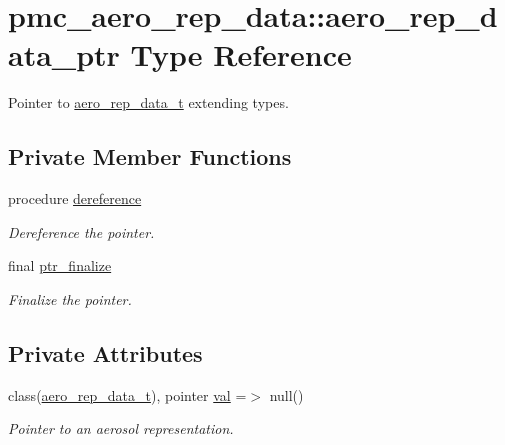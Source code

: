 \hypertarget{structpmc__aero__rep__data_1_1aero__rep__data__ptr}{}\section{pmc\+\_\+aero\+\_\+rep\+\_\+data\+:\+:aero\+\_\+rep\+\_\+data\+\_\+ptr Type Reference}
\label{structpmc__aero__rep__data_1_1aero__rep__data__ptr}


Pointer to \mbox{\hyperlink{structpmc__aero__rep__data_1_1aero__rep__data__t}{aero\+\_\+rep\+\_\+data\+\_\+t}} extending types.  


\subsection*{Private Member Functions}
\begin{DoxyCompactItemize}
\item 
procedure \mbox{\hyperlink{structpmc__aero__rep__data_1_1aero__rep__data__ptr_aca211c3f25778cc8e8d2d9cf073e60e5}{dereference}}
\begin{DoxyCompactList}\small\item\em Dereference the pointer. \end{DoxyCompactList}\item 
final \mbox{\hyperlink{structpmc__aero__rep__data_1_1aero__rep__data__ptr_a6846a2047acedd772645623f8e03e207}{ptr\+\_\+finalize}}
\begin{DoxyCompactList}\small\item\em Finalize the pointer. \end{DoxyCompactList}\end{DoxyCompactItemize}
\subsection*{Private Attributes}
\begin{DoxyCompactItemize}
\item 
class(\mbox{\hyperlink{structpmc__aero__rep__data_1_1aero__rep__data__t}{aero\+\_\+rep\+\_\+data\+\_\+t}}), pointer \mbox{\hyperlink{structpmc__aero__rep__data_1_1aero__rep__data__ptr_aaf50e4bd503c015406c09649cd458a5a}{val}} =$>$ null()
\begin{DoxyCompactList}\small\item\em Pointer to an aerosol representation. \end{DoxyCompactList}\end{DoxyCompactItemize}


